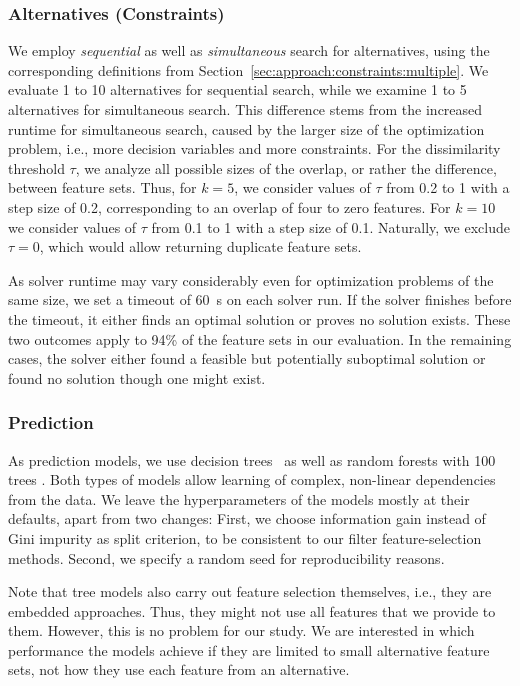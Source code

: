 \documentclass{article}
\theoremstyle{definition}
\begin{document}
\subsubsection{Alternatives (Constraints)}
\label{sec:experimental-design:approaches:alternatives}

We employ \emph{sequential} as well as \emph{simultaneous} search for alternatives, using the corresponding definitions from Section~\ref{sec:approach:constraints:multiple}.
We evaluate 1 to 10 alternatives for sequential search, while we examine 1 to 5 alternatives for simultaneous search.
This difference stems from the increased runtime for simultaneous search, caused by the larger size of the optimization problem, i.e., more decision variables and more constraints.
For the dissimilarity threshold $\tau$, we analyze all possible sizes of the overlap, or rather the difference, between feature sets.
Thus, for $k=5$, we consider values of $\tau$ from 0.2 to 1 with a step size of 0.2, corresponding to an overlap of four to zero features.
For $k=10$ we consider values of $\tau$ from 0.1 to 1 with a step size of 0.1.
Naturally, we exclude $\tau = 0$, which would allow returning duplicate feature sets.

As solver runtime may vary considerably even for optimization problems of the same size, we set a timeout of 60~s on each solver run.
If the solver finishes before the timeout, it either finds an optimal solution or proves no solution exists.
These two outcomes apply to 94\% of the feature sets in our evaluation.
In the remaining cases, the solver either found a feasible but potentially suboptimal solution or found no solution though one might exist.

\subsubsection{Prediction}
\label{sec:experimental-design:approaches:prediction}

As prediction models, we use decision trees~\cite{breiman1984classification} as well as random forests with 100 trees \cite{breiman2001random}.
Both types of models allow learning of complex, non-linear dependencies from the data.
We leave the hyperparameters of the models mostly at their defaults, apart from two changes:
First, we choose information gain instead of Gini impurity as split criterion, to be consistent to our filter feature-selection methods.
Second, we specify a random seed for reproducibility reasons.

Note that tree models also carry out feature selection themselves, i.e., they are embedded approaches.
Thus, they might not use all features that we provide to them.
However, this is no problem for our study.
We are interested in which performance the models achieve if they are limited to small alternative feature sets, not how they use each feature from an alternative.
\end{document}
